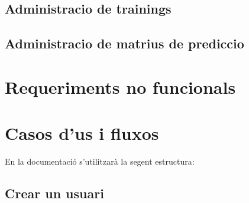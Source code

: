 \subsection{Administracio de trainings}

\subsection{Administracio de matrius de prediccio}



\section{Requeriments no funcionals}



\section{Casos d'us i fluxos}
En la documentaci\'{o} s'utilitzar\`{a} la segent estructura:\\
\subsection{Crear un usuari}
\begin{usecase}
\end{usecase}



